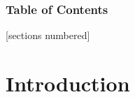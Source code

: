 
\maketitle

\begin{frame}[fragile]
  \frametitle{Table of Contents}
  [sections numbered]
  \tableofcontents
\end{frame}

\section{Introduction}

